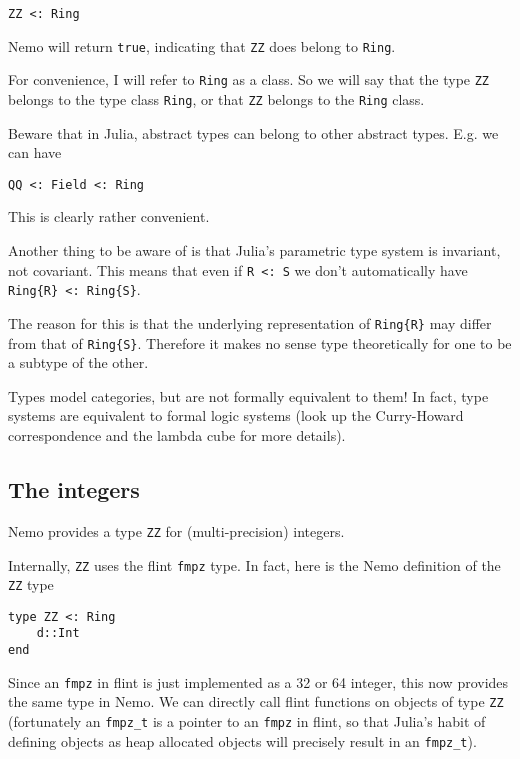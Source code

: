 \documentclass[a4paper,10pt]{article}
\newcommand{\code}{\lstinline}
\begin{document}
{\begin{lstlisting}
ZZ <: Ring
\end{lstlisting}

Nemo will return \code{true}, indicating that \code{ZZ} does belong to \code{Ring}.

For convenience, I will refer to \code{Ring} as a class. So we will say that the 
type \code{ZZ} belongs to the type class \code{Ring}, or that \code{ZZ} belongs to
the \code{Ring} class.

Beware that in Julia, abstract types can belong to other abstract types. E.g. we
can have

\begin{lstlisting}
QQ <: Field <: Ring
\end{lstlisting}

This is clearly rather convenient.

Another thing to be aware of is that Julia's parametric type system is invariant,
not covariant. This means that even if \code{R <: S} we don't automatically have
\code|Ring{R} <: Ring{S}|.

The reason for this is that the underlying representation of \code|Ring{R}| may
differ from that of \code|Ring{S}|. Therefore it makes no sense type theoretically
for one to be a subtype of the other.

Types model categories, but are not formally equivalent to them! In fact, type
systems are equivalent to formal logic systems (look up the Curry-Howard
correspondence and the lambda cube for more details).

\subsection{The integers}

Nemo provides a type \code{ZZ} for (multi-precision) integers.

Internally, \code{ZZ} uses the flint \code{fmpz} type. In fact, here is the Nemo
definition of the \code{ZZ} type

\begin{lstlisting}
type ZZ <: Ring
    d::Int
end
\end{lstlisting}

Since an \code{fmpz} in flint is just implemented as a 32 or 64 integer, this now 
provides the same type in Nemo. We can directly call flint functions on objects of
type \code{ZZ} (fortunately an \code{fmpz_t} is a pointer to an \code{fmpz} in 
flint, so that Julia's habit of defining objects as heap allocated objects will 
precisely result in an \code{fmpz_t}).

}
\end{document}
